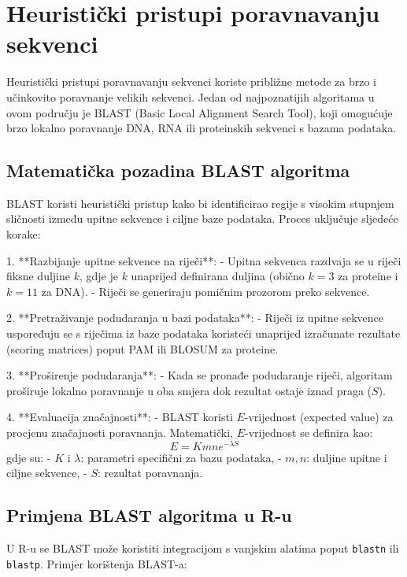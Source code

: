 \documentclass[10pt,a4paper,twoside]{article}
\begin{document}
\section*{Heuristički pristupi poravnavanju sekvenci}

Heuristički pristupi poravnavanju sekvenci koriste približne metode za brzo i učinkovito poravnanje velikih sekvenci. Jedan od najpoznatijih algoritama u ovom području je BLAST (Basic Local Alignment Search Tool), koji omogućuje brzo lokalno poravnanje DNA, RNA ili proteinskih sekvenci s bazama podataka.

\subsection*{Matematička pozadina BLAST algoritma}

BLAST koristi heuristički pristup kako bi identificirao regije s visokim stupnjem sličnosti između upitne sekvence i ciljne baze podataka. Proces uključuje sljedeće korake:

1. **Razbijanje upitne sekvence na riječi**:
- Upitna sekvenca razdvaja se u riječi fiksne duljine \( k \), gdje je \( k \) unaprijed definirana duljina (obično \( k = 3 \) za proteine i \( k = 11 \) za DNA).
- Riječi se generiraju pomičnim prozorom preko sekvence.

2. **Pretraživanje podudaranja u bazi podataka**:
- Riječi iz upitne sekvence uspoređuju se s riječima iz baze podataka koristeći unaprijed izračunate rezultate (scoring matrices) poput PAM ili BLOSUM za proteine.

3. **Proširenje podudaranja**:
- Kada se pronađe podudaranje riječi, algoritam proširuje lokalno poravnanje u oba smjera dok rezultat ostaje iznad praga (\( S \)).

4. **Evaluacija značajnosti**:
- BLAST koristi \( E \)-vrijednost (expected value) za procjenu značajnosti poravnanja. Matematički, \( E \)-vrijednost se definira kao:
\[
E = Kmne^{-\lambda S}
\]
gdje su:
- \( K \) i \( \lambda \): parametri specifični za bazu podataka,
- \( m, n \): duljine upitne i ciljne sekvence,
- \( S \): rezultat poravnanja.

\subsection*{Primjena BLAST algoritma u R-u}

U R-u se BLAST može koristiti integracijom s vanjskim alatima poput \texttt{blastn} ili \texttt{blastp}. Primjer korištenja BLAST-a:
\end{document}
